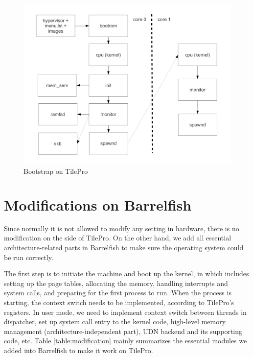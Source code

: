 \documentclass[a4paper,twoside]{report} %
\begin{document}
\begin{figure}
\centering
\includegraphics[scale=0.45]{figures/bootstrap_on_tilepro}
\caption{Bootstrap on TilePro}
\label{pic:bootstrap}
\end{figure}

\section{Modifications on Barrelfish}
Since normally it is not allowed to modify any setting in hardware, there is no modification on the side of TilePro. On the other hand, we add all essential architecture-related parts in Barrelfish to make sure the operating system could be run correctly.

The first step is to initiate the machine and boot up the kernel, in which includes setting up the page tables, allocating the memory, handling interrupts and system calls, and preparing for the first process to run. When the process is starting, the context switch needs to be implemented, according to TilePro's registers. In user mode, we need to implement context switch between threads in dispatcher, set up system call entry to the kernel code, high-level memory management (architecture-independent part), UDN backend and its supporting code, etc. Table \ref{table:modification} mainly summarizes the essential modules we added into Barrelfish to make it work on TilePro. 
\end{document}

